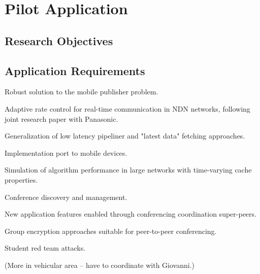 \section{Pilot Application}

\subsection{Research Objectives}

\subsection{Application Requirements} 

Robust solution to the mobile publisher problem. 

Adaptive rate control for real-time communication in NDN networks, following joint research paper with Panasonic. 

Generalization of low latency pipeliner and "latest data" fetching approaches. 

Implementation port to mobile devices. 

Simulation of algorithm performance in large networks with time-varying cache properties. 

Conference discovery and management. 

New application features enabled through conferencing coordination super-peers. 

Group encryption approaches suitable for peer-to-peer conferencing. 

Student red team attacks.

(More in vehicular area – have to coordinate with Giovanni.)

